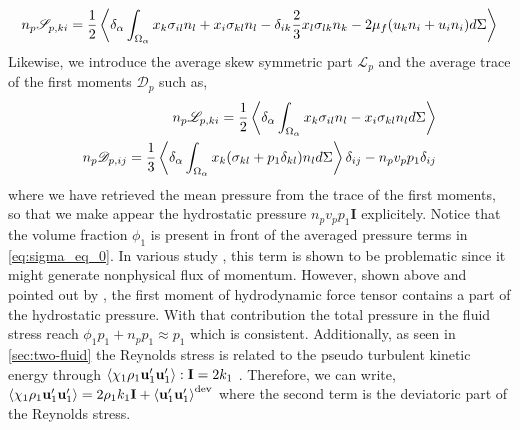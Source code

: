 \begin{equation}
    \label{eq:stresslet_def}
    n_p \mathscr{S}_{p,ki}
    = \frac{1}{2}
    \left<\delta_\alpha \int_{\Omega_\alpha} 
        x_k \sigma_{il}n_l + x_i \sigma_{kl}n_l 
        - \delta_{ik}
        \frac{2}{3}
        x_l \sigma_{lk}n_k
        - 2 \mu_f (u_k n_i+u_i n_i)
     d\Sigma\right>
\end{equation}
Likewise, we introduce the average skew symmetric part $\mathscr{L}_p$ and the average trace of the first moments $\mathscr{D}_p$ such as, 
\begin{align}
    \label{eq:torque_def}
    n_p \mathscr{L}_{p,ki}
    = \frac{1}{2}\left<\delta_\alpha \int_{\Omega_\alpha}  x_k \sigma_{il}n_l - x_i \sigma_{kl}n_l  d\Sigma\right>\\
    \label{eq:trace_def}
    n_p \mathscr{D}_{p,ij}
    = \frac{1}{3}\left<\delta_\alpha \int_{\Omega_\alpha}  x_k (\sigma_{kl} + p_1 \delta_{kl})n_l  d\Sigma\right> \delta_{ij}
    - n_p v_p p_1 \delta_{ij}
\end{align}
where we have retrieved the mean pressure from the trace of the first moments, so that we make appear the hydrostatic pressure  $n_p v_p p_1 \textbf{I}$ explicitely.  
Notice that the volume fraction $\phi_1$ is present in front of the averaged pressure terms in \ref{eq:sigma_eq_0}.  
In various study \citep{prosperetti2009computational,chu2016flux}, this term is shown to be problematic  since it might generate nonphysical flux of momentum. 
However, shown above and pointed out by  \citet{zhang1997momentum,jackson1997locally}, the first moment of hydrodynamic force tensor contains a part of the hydrostatic pressure.
With that contribution the total pressure in the fluid stress reach $\phi_1p_1 + n_p p_1 \approx p_1$ which is consistent.
Additionally, as seen in \ref{sec:two-fluid} the Reynolds stress is related to the pseudo turbulent kinetic energy through $\left<\chi_1 \rho_1\textbf{u}_1'\textbf{u}_1'\right> : \textbf{I} = 2k_1$ . 
Therefore, we can write, $\left<\chi_1 \rho_1\textbf{u}_1'\textbf{u}_1'\right> = 2 \rho_1 k_1 \textbf{I} + \left<\textbf{u}_1'\textbf{u}_1'\right>^\text{dev}$ where the second term is the deviatoric part of the Reynolds stress. 

